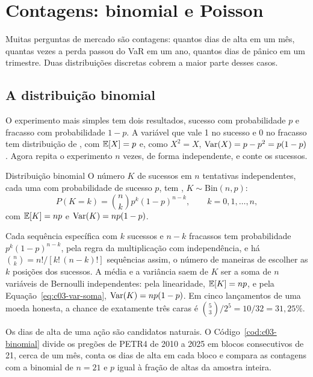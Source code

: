 \section{Contagens: binomial e Poisson}
\label{sec:c03-contagens}

Muitas perguntas de mercado são contagens: quantos dias de alta em um mês, quantas vezes a perda passou do VaR em um ano, quantos dias de pânico em um trimestre. Duas distribuições discretas cobrem a maior parte desses casos.

\subsection{A distribuição binomial}
\label{sec:c03-binomial}

O experimento mais simples tem dois resultados, sucesso com probabilidade $p$ e fracasso com probabilidade $1-p$. A variável que vale 1 no sucesso e 0 no fracasso tem distribuição de , com $\operatorname{\mathbb{E}}[X] = p$ e, como $X^2 = X$, $\operatorname{Var}(X) = p - p^2 = p(1-p)$. Agora repita o experimento $n$ vezes, de forma independente, e conte os sucessos.

\begin{definicao}{Distribuição binomial}
O número $K$ de sucessos em $n$ tentativas independentes, cada uma com probabilidade de sucesso $p$, tem , $K \sim \mathrm{Bin}(n, p)$:
\begin{equation}
  P(K = k) = \binom{n}{k} p^k (1-p)^{n-k} , \qquad k = 0, 1, \dots, n ,
  \label{eq:c03-binomial}
\end{equation}
com $\operatorname{\mathbb{E}}[K] = np$ e $\operatorname{Var}(K) = np(1-p)$.
\end{definicao}

Cada sequência específica com $k$ sucessos e $n-k$ fracassos tem probabilidade $p^k(1-p)^{n-k}$, pela regra da multiplicação com independência, e há $\binom{n}{k} = n!/[k!\,(n-k)!]$ sequências assim, o número de maneiras de escolher as $k$ posições dos sucessos. A média e a variância saem de $K$ ser a soma de $n$ variáveis de Bernoulli independentes: pela linearidade, $\operatorname{\mathbb{E}}[K] = np$, e pela Equação~\eqref{eq:c03-var-soma}, $\operatorname{Var}(K) = np(1-p)$. Em cinco lançamentos de uma moeda honesta, a chance de exatamente três caras é $\binom{5}{3}/2^5 = 10/32 = 31,25\%$.

Os dias de alta de uma ação são candidatos naturais. O Código~\ref{cod:c03-binomial} divide os pregões de PETR4 de 2010 a 2025 em blocos consecutivos de 21, cerca de um mês, conta os dias de alta em cada bloco e compara as contagens com a binomial de $n = 21$ e $p$ igual à fração de altas da amostra inteira.

